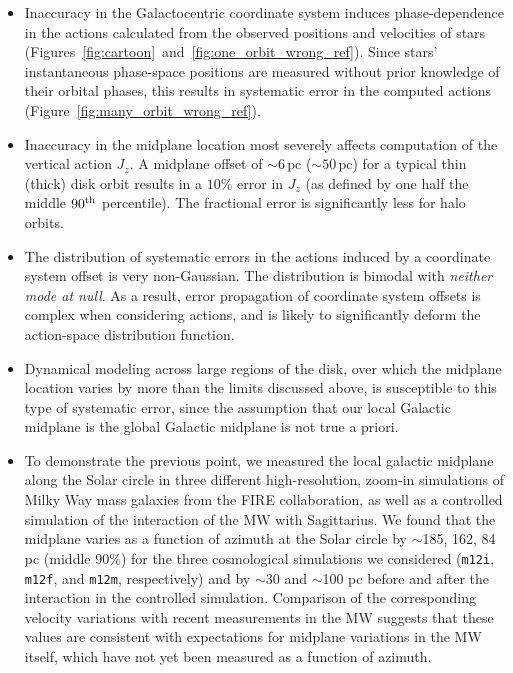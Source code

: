 \documentclass[twocolumn]{aastex62}
\newcommand{\pc}{\text{pc}}
\newcommand{\mi}{\texttt{m12i}}
\newcommand{\mf}{\texttt{m12f}}
\newcommand{\mm}{\texttt{m12m}}
\newcommand{\uth}{\textsuperscript{th}}
\begin{document}
\begin{itemize}
\item Inaccuracy in the Galactocentric coordinate
system induces phase-dependence in the actions calculated from the observed
positions and velocities of stars
(Figures~\ref{fig:cartoon}~and~\ref{fig:one_orbit_wrong_ref}). Since stars'
instantaneous phase-space positions are measured without prior knowledge of
their orbital phases, this results in systematic error in the computed actions
(Figure~\ref{fig:many_orbit_wrong_ref}).

\item Inaccuracy in the midplane location most severely affects computation of
the vertical action $J_z$.  A midplane offset of $\sim6\,\pc$ ($\sim50\,\pc$)
for a typical thin (thick) disk orbit results in a  $10\%$ error in $J_z$ (as
defined by one half the middle $90\uth$ percentile). The fractional error is
significantly less for halo orbits.

\item The distribution of systematic errors in the actions induced by a
coordinate system offset is very non-Gaussian. The distribution is bimodal
with \emph{neither mode at null}. As a result, error propagation of coordinate
system offsets is complex when considering actions, and is likely to
significantly deform the action-space distribution function.

\item Dynamical modeling across large regions of the disk, over which the
midplane location varies by more than the limits discussed above, is
susceptible to this type of systematic error, since the assumption that our
local Galactic midplane is the global Galactic midplane is not true a
priori.

\item To demonstrate the previous point, we measured the local galactic
midplane along the Solar circle in three different high-resolution, zoom-in
simulations of Milky Way mass galaxies from the FIRE collaboration, as well as a controlled simulation of the interaction of the MW with Sagittarius. We found
that the midplane varies as a function of azimuth at the Solar circle by
$\sim$185, 162, 84 pc (middle $90\%$) for the three cosmological simulations we considered
(\mi{}, \mf{}, and \mm{}, respectively) and by $\sim$30 and $\sim$100 pc before and after the interaction in the controlled simulation. Comparison of the corresponding velocity variations with recent measurements in the MW suggests that these values are consistent with expectations for midplane variations in the MW itself, which have not yet been measured as a function of azimuth.


\end{itemize}
\end{document}
